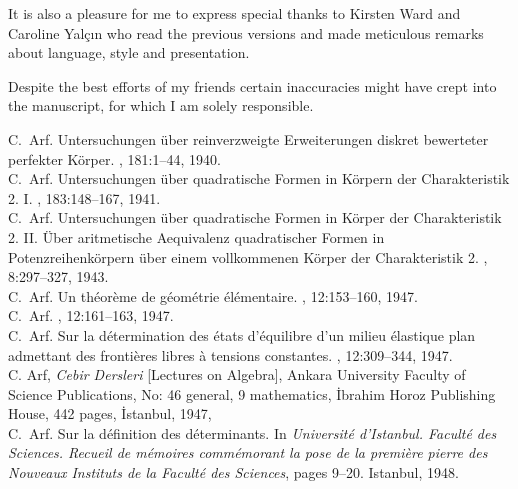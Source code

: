 \documentclass[12pt]{amsart}
\begin{document}
It is also a pleasure for me to express special thanks to Kirsten Ward and Caroline Yal\c{c}{\i}n who read the previous versions and made meticulous remarks about language, style and presentation.

Despite the best efforts of my friends certain inaccuracies might have crept into the manuscript, for which I am  solely responsible.

\newpage

\begin{thebibliography}{10}

C.~Arf.
\newblock Untersuchungen \"uber reinverzweigte {E}rweiterungen diskret
  bewerteter perfekter {K}\"orper.
, 181:1--44, 1940.\\

C.~Arf.
\newblock Untersuchungen \"uber quadratische {F}ormen in {K}\"orpern der
  {C}harakteristik 2. {I}.
, 183:148--167, 1941. \\

C.~Arf.
\newblock Untersuchungen \"uber quadratische {F}ormen in {K}\"orper der
  {C}harakteristik 2. {I}{I}. \"{U}ber aritmetische {A}equivalenz quadratischer
  {F}ormen in {P}otenzreihenk\"orpern \"uber einem vollkommenen {K}\"orper der
  {C}harakteristik 2.
, 8:297--327, 1943. \\
C.~Arf.
\newblock Un th\'eor\`eme de g\'eom\'etrie \'el\'ementaire.
, 12:153--160, 1947. \\

C.~Arf.
, 12:161--163, 1947.\\

C.~Arf.
\newblock Sur la d\'etermination des \'etats d'\'equilibre d'un milieu
  \'elastique plan admettant des fronti\`eres libres \`a tensions constantes.
, 12:309--344, 1947.\\

 C. Arf, {\em Cebir Dersleri} [Lectures on Algebra], Ankara University Faculty of Science Publications, No: 46 general, 9 mathematics, {\.I}brahim Horoz Publishing House,  442 pages, {\.I}stanbul, 1947,\\

C.~Arf.
\newblock Sur la d\'efinition des d\'eterminants.
\newblock In {\em Universit\'e d'Istanbul. Facult\'e des Sciences. Recueil de
  m\'emoires comm\'emorant la pose de la premi\`ere pierre des Nouveaux
  Instituts de la Facult\'e des Sciences}, pages 9--20.
  Istanbul, 1948.\\


\end{thebibliography}
\end{document}
